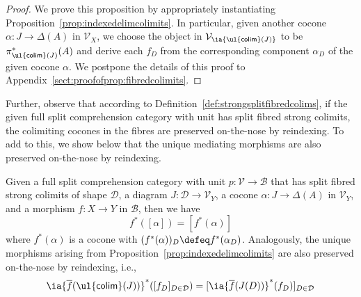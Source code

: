 \begin{proof}
We prove this proposition by appropriately instantiating Proposition~\ref{prop:indexedelimcolimits}. 
In particular, given another cocone $\alpha : J \longrightarrow \Delta(A)$ in $\mathcal{V}_X$, we choose the object in $\mathcal{V}_{\ia {\mathsf{\ul{colim}}(J)}}$ to be $\pi^*_{\mathsf{\ul{colim}}(J)}(A)$ 
and derive each $f_D$ from the corresponding component $\alpha_D$ of the given cocone $\alpha$.
We postpone the details of this proof to Appendix~\ref{sect:proofofprop:fibredcolimits}.
\end{proof}

Further, observe that according to Definition~\ref{def:strongsplitfibredcolims}, if the given full split comprehension category with unit has split fibred strong colimits, the colimiting cocones in the fibres are preserved on-the-nose by reindexing. To add to this, we show below that the unique mediating morphisms are also preserved on-the-nose by reindexing.


\begin{proposition}
Given a full split comprehension category with unit $p : \mathcal{V} \longrightarrow \mathcal{B}$ 
that has split fibred strong colimits of shape $\mathcal{D}$, a diagram $J : \mathcal{D} \longrightarrow \mathcal{V}_Y$, a cocone $\alpha : J \longrightarrow \Delta(A)$ in $\mathcal{V}_Y$, and a morphism $f : X \longrightarrow Y$ in $\mathcal{B}$, then we have 
\[
f^*([\alpha]) = [f^*(\alpha)]
\]
where $f^*(\alpha)$ is a cocone with $(f^*(\alpha))_D \defeq f^*(\alpha_D)$.
Analogously, the unique morphisms arising from Proposition~\ref{prop:indexedelimcolimits} are also preserved on-the-nose by reindexing, i.e., 
\[
\ia {\overline{f}(\mathsf{\ul{colim}}(J))}^*([f_D]_{D \in \mathcal{D}}) = [\ia {\overline{f}(J(D))}^*(f_D)]_{D \in \mathcal{D}}
\]
\end{proposition}

